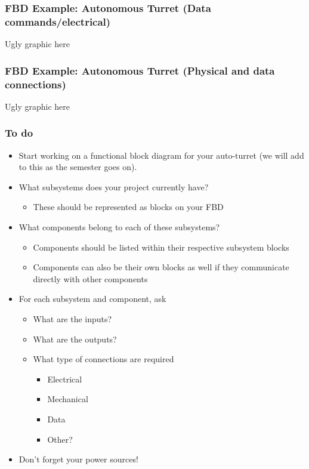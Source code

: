 \documentclass[aspectratio=169]{beamer}
\begin{document}

\begin{frame}
\frametitle{FBD Example: Autonomous Turret (Data commands/electrical)}
Ugly graphic here
\end{frame}

\begin{frame}
\frametitle{FBD Example: Autonomous Turret (Physical and data connections)}
Ugly graphic here
\end{frame}

\begin{frame}
\frametitle{To do}
\begin{itemize}
\item Start working on a functional block diagram for your auto-turret (we will add to this as the semester goes on). 
\item What subsystems does your project currently have? 
\begin{itemize}
\item These should be represented as blocks on your FBD
\end{itemize}
\item What components belong to each of these subsystems?
\begin{itemize}
\item Components should be listed within their respective subsystem blocks
\item Components can also be their own blocks as well if they communicate directly with other components
\end{itemize}
\item For each subsystem and component, ask
\begin{itemize}
\item What are the inputs?
\item What are the outputs?
\item What type of connections are required 
\begin{itemize}
\item Electrical
\item Mechanical
\item Data
\item Other?
\end{itemize}
\end{itemize}
\item Don’t forget your power sources!
\end{itemize}
\end{frame}
\end{document}
